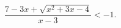 \begin{ex}[type=inequality]
	\begin{condition}
		$\dfrac{7 - 3x + \sqrt{x^2 + 3x - 4}}{x - 3}<-1 .$
	\end{condition}
\end{ex}